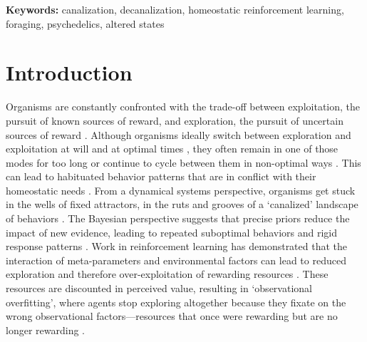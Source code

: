 \documentclass[12pt,fleqn]{article}
\begin{document}
\vspace{0.5em}
\noindent\textbf{Keywords:} canalization, decanalization, homeostatic reinforcement learning, foraging, psychedelics, altered states

\section{Introduction}

Organisms are constantly confronted with the trade-off between exploitation, the pursuit of known sources of reward, and exploration, the pursuit of uncertain sources of reward \cite{stephens_foraging_1986}. Although organisms ideally switch between exploration and exploitation at will and at optimal times \cite{pearson_decision_2014}, they often remain in one of those modes for too long or continue to cycle between them in non-optimal ways \cite{barack_neurocomputational_2016, addicott_primer_2017}. This can lead to habituated behavior patterns that are in conflict with their homeostatic needs \cite{bernard_lectures_1974}. From a dynamical systems perspective, organisms get stuck in the wells of fixed attractors, in the ruts and grooves of a ‘canalized’ landscape of behaviors \cite{waddington_canalization_1959, carhart-harris_canalization_2023}. The Bayesian perspective suggests that precise priors reduce the impact of new evidence, leading to repeated suboptimal behaviors and rigid response patterns \cite{carhart-harris_rebus_2019, carhart-harris_canalization_2023}. Work in reinforcement learning \cite{sutton_reinforcement_1998} has demonstrated that the interaction of meta-parameters and environmental factors can lead to reduced exploration and therefore over-exploitation of rewarding resources \cite{huys_mapping_2013}. These resources are discounted in perceived value, resulting in ‘observational overfitting’, where agents stop exploring altogether because they fixate on the wrong observational factors---resources that once were rewarding but are no longer rewarding \cite{song_observational_2019}.
\end{document}
